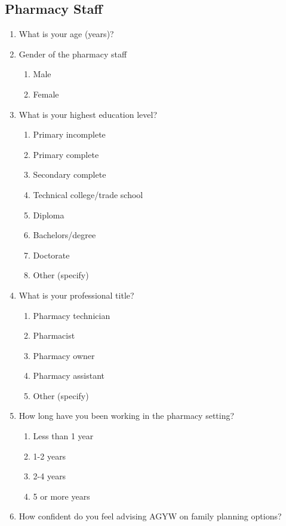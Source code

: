 \subsection{Pharmacy Staff}
\begin{enumerate}
    \item What is your age (years)?
    \item Gender of the pharmacy staff
        \begin{enumerate}
            \item Male
            \item {Female}
        \end{enumerate}
    \item What is your highest education level?
        \begin{enumerate}
            \item Primary incomplete
            \item Primary complete
            \item Secondary complete
            \item Technical college/trade school
            \item Diploma
            \item Bachelors/degree
            \item Doctorate
            \item Other (specify)
        \end{enumerate}
    \item What is your professional title?
        \begin{enumerate}
            \item Pharmacy technician
            \item Pharmacist
            \item Pharmacy owner
            \item Pharmacy assistant
            \item Other (specify)
        \end{enumerate}
    \item How long have you been working in the pharmacy setting?
        \begin{enumerate}
            \item Less than 1 year
            \item 1-2 years
            \item 2-4 years
            \item 5 or more years
        \end{enumerate}
    \item How confident do you feel advising AGYW on family planning options?

\end{enumerate}
